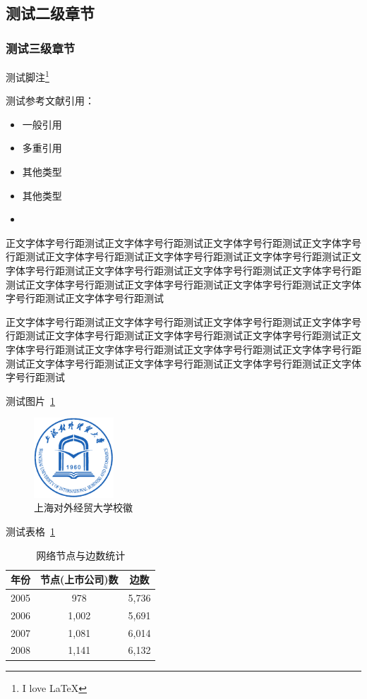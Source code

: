 \documentclass{SUIBEthesis}
\begin{document}
\subsection{测试二级章节}
\subsubsection{测试三级章节}

测试脚注\footnote{I love \LaTeX}

测试参考文献引用：

\begin{itemize}
\item 一般引用\cite{lamport1994latex}
\item 多重引用\cite{lamport1994latex, knuth1984texbook}
\item 其他类型\cite[see][]{knuth1984texbook}
\item 其他类型\cite[section2]{knuth1984texbook}
  \item \cite[see][]{knuth1984texbook, lamport1994latex}
\end{itemize}


正文字体字号行距测试正文字体字号行距测试正文字体字号行距测试正文字体字号行距测试正文字体字号行距测试正文字体字号行距测试正文字体字号行距测试正文字体字号行距测试正文字体字号行距测试正文字体字号行距测试正文字体字号行距测试正文字体字号行距测试正文字体字号行距测试正文字体字号行距测试正文字体字号行距测试正文字体字号行距测试

正文字体字号行距测试正文字体字号行距测试正文字体字号行距测试正文字体字号行距测试正文字体字号行距测试正文字体字号行距测试正文字体字号行距测试正文字体字号行距测试正文字体字号行距测试正文字体字号行距测试正文字体字号行距测试正文字体字号行距测试正文字体字号行距测试正文字体字号行距测试正文字体字号行距测试


测试图片~\ref{fig:1} 

\begin{figure}[htbp!]
  \centering
  \includegraphics[height=3cm]{data/figure/logo.pdf}
  \caption{上海对外经贸大学校徽}
  \label{fig:1}
\end{figure}


测试表格~\ref{tab:1}

\begin{table}[htbp]
  \centering
  \caption{网络节点与边数统计}
  \begin{tabular}{ccc}
    \toprule
    \toprule
    年份    & 节点(上市公司)数   & 边数 \\
    \midrule
    2005  & 978   & 5,736 \\
    2006  & 1,002 & 5,691 \\
    2007  & 1,081 & 6,014 \\
    2008  & 1,141 & 6,132 \\
    \bottomrule
    \bottomrule
  \end{tabular}%
  \label{tab:1}%
\end{table}%
\end{document}
